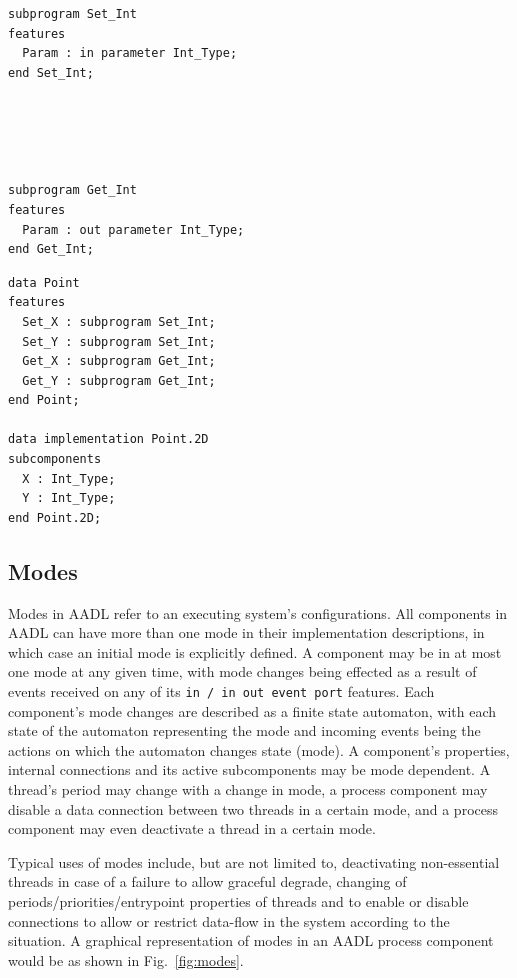 \begin{minipage}{0.45\linewidth}
\lstset{language=aadl}
\centering
\begin{lstlisting}[label=lst:subprog_features, caption=Subprograms
    for data type declaration]
subprogram Set_Int
features
  Param : in parameter Int_Type;
end Set_Int;





subprogram Get_Int
features
  Param : out parameter Int_Type;
end Get_Int;
\end{lstlisting}
\end{minipage}
\hspace{0.5cm}
\begin{minipage}{0.45\linewidth}
\centering
\begin{lstlisting}[label=lst:data_type_subprog, caption=Data type with
  subprogram features]
data Point
features
  Set_X : subprogram Set_Int;
  Set_Y : subprogram Set_Int;
  Get_X : subprogram Get_Int;
  Get_Y : subprogram Get_Int;
end Point;

data implementation Point.2D
subcomponents
  X : Int_Type;
  Y : Int_Type;
end Point.2D;
\end{lstlisting}
\end{minipage}

\subsection{Modes}
Modes in AADL refer to an executing system's configurations. All
components in AADL can have more than one mode in their implementation
descriptions, in which case an initial mode is explicitly defined. A
component may be in at most one mode at any given time, with mode
changes being effected as a result of events received on any of its
\texttt{in / in out event port} features. Each component's mode
changes are described as a finite state automaton, with each state of
the automaton representing the mode and incoming events being the
actions on which the automaton changes state (mode). A component's
properties, internal connections and its active subcomponents may be
mode dependent. A thread's period may change with a change in mode, a
process component may disable a data connection between two threads in
a certain mode, and a process component may even deactivate a thread
in a certain mode.

Typical uses of modes include, but are not limited to, deactivating
non-essential threads in case of a failure to allow graceful degrade,
changing of periods/priorities/entrypoint properties of threads and to
enable or disable connections to allow or restrict data-flow in the
system according to the situation. A graphical representation of modes
in an AADL process component would be as shown in
Fig.~\ref{fig:modes}.


